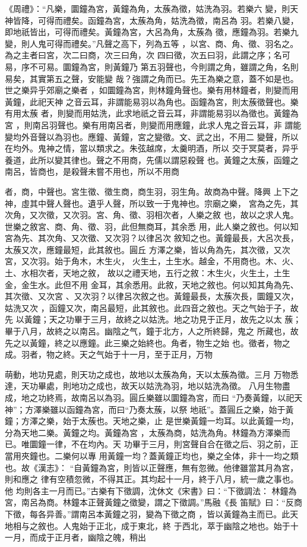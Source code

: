 \documentclass{ctexart}
\begin{document}
《周禮》：``凡樂，圜鐘為宮，黃鐘為角，太蔟為徵，姑洗為羽。若樂六 變，則天神皆降，可得而禮矣。函鐘為宮，太蔟為角，姑洗為徵，南呂為 羽。若樂八變，即地祇皆出，可得而禮矣。黃鐘為宮，大呂為角，太蔟為 徵，應鐘為羽。若樂九變，則人鬼可得而禮矣。''凡聲之高下，列為五等 ，以宮、商、角、徵、羽名之。為之主者曰宮，次二曰商，次三曰角，次 四曰徵，次五曰羽，此謂之序；名可易，序不可易。圜鐘為宮，則黃鐘乃 第五羽聲也，今則謂之角，雖謂之角，名則易矣，其實第五之聲，安能變 哉？強謂之角而已。先王為樂之意，蓋不如是也。世之樂异乎郊廟之樂者 ，如圜鐘為宮，則林鐘角聲也。樂有用林鐘者，則變而用黃鐘，此祀天神 之音云耳，非謂能易羽以為角也。函鐘為宮，則太蔟徵聲也。樂有用太蔟 者，則變而用姑洗，此求地祇之音云耳，非謂能易羽以為徵也。黃鐘為宮 ，則南呂羽聲也。樂有用南呂者，則變而用應鐘，此求人鬼之音云耳，非 謂能變均外音聲以為羽也。應鐘、黃鐘，宮之變徵。文、武之出，不用二 變聲，所以在均外。鬼神之情，當以類求之。朱弦越席，太羹明酒，所以 交于冥莫者，异乎養道，此所以變其律也。聲之不用商，先儒以謂惡殺聲 也。黃鐘之太蔟，函鐘之南呂，皆商也，是殺聲未嘗不用也，所以不用商

者，商，中聲也。宮生徵、徵生商，商生羽，羽生角。故商為中聲。降興 上下之神，虛其中聲人聲也。遺乎人聲，所以致一于鬼神也。宗廟之樂， 宮為之先，其次角，又次徵，又次羽。宮、角、徵、羽相次者，人樂之敘 也，故以之求人鬼。世樂之敘宮、商、角、徵、羽，此但無商耳，其余悉 用，此人樂之敘也。何以知宮為先、其次角、又次徵、又次羽？以律呂次 敘知之也。黃鐘最長，大呂次長，太蔟又次，應鐘最短，此其敘也。圓丘 方澤之樂，皆以角為先，其次徵，又次宮，又次羽。始于角木，木生火， 火生土，土生水。越金，不用商也。木、火、土、水相次者，天地之敘， 故以之禮天地，五行之敘：木生火，火生土，土生金，金生水。此但不用 金耳，其余悉用。此敘，天地之敘也。何以知其角為先、其次徵、又次宮 、又次羽？以律呂次敘之也。黃鐘最長，太蔟次長，圜鐘又次，姑洗又次 ，函鐘又次，南呂最短，此其敘也。此四音之敘也。天之气始于子，故先 以黃鐘；天之功畢于三月，故終之以姑洗。地之功見于正月，故先之以太 蔟；畢于八月，故終之以南呂。幽陰之气，鐘于北方，人之所終歸，鬼之 所藏也，故先之以黃鐘，終之以應鐘。此三樂之始終也。角者，物生之始 也。徵者，物之成。羽者，物之終。天之气始于十一月，至于正月，万物

萌動，地功見處，則天功之成也，故地以太蔟為角，天以太蔟為徵。三月 万物悉達，天功畢處，則地功之成也，故天以姑洗為羽，地以姑洗為徵。 八月生物盡成，地之功終焉，故南呂以為羽。圓丘樂雖以圜鐘為宮，而曰 ``乃奏黃鐘，以祀天神''；方澤樂雖以函鐘為宮，而曰``乃奏太蔟，以祭 地祇''。蓋圓丘之樂，始于黃鐘；方澤之樂，始于太蔟也。天地之樂，止 是世樂黃鐘一均耳。以此黃鐘一均，分為天地二樂。黃鐘之均。黃鐘為宮 ，太蔟為商，姑洗為角。林鐘為方澤樂而已。唯圜鐘一律，不在均內。天 功畢于三月，則宮聲自合在徵之后、羽之前，正當用夾鐘也。二樂何以專 用黃鐘一均？蓋黃鐘正均也，樂之全体，非十一均之類也。故《漢志》： ``自黃鐘為宮，則皆以正聲應，無有忽微。他律雖當其月為宮，則和應之 律有空積忽微，不得其正。其均起十一月，終于八月，統一歲之事也。他 均則各主一月而已。''古樂有下徵調，沈休文《宋書》曰：``下徵調法： 林鐘為宮，南呂為商。林鐘本正聲黃鐘之徵變，謂之下徵調。''馬融《長 笛賦》曰：``反商下徵，每各异善。''謂南呂本黃鐘之羽，變為下徵之商 ，皆以黃鐘為主而已。此天地相与之敘也。人鬼始于正北，成于東北，終 于西北，萃于幽陰之地也。始于十一月，而成于正月者，幽陰之魄，稍出
\end{document}
